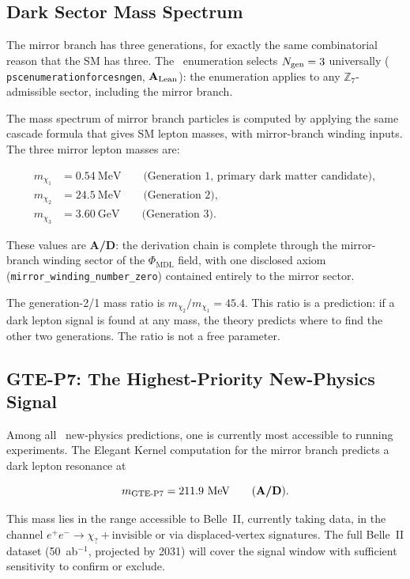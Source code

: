 \documentclass[11pt,openany]{book}
\theoremstyle{remark}
\newcommand{\GTE}{\text{GTE}}
\newcommand{\MDL}{\text{MDL}}
\newcommand{\PSC}{\text{PSC}}
\newcommand{\ZS}{\mathbb{Z}_7}
\newcommand{\lean}[1]{%
  \penalty-100
  \begingroup\def\_{\textunderscore\allowbreak}\texttt{#1}\endgroup}
\newcommand{\CatAL}{\ensuremath{\textbf{A}_{\rm Lean}}}
\newcommand{\CatAD}{\textbf{A/D}}
\begin{document}
\subsection*{Dark Sector Mass Spectrum}

The mirror branch has three generations, for exactly the same combinatorial reason that
the SM has three.  The \PSC\ enumeration selects $N_{\rm gen} = 3$ universally
(\lean{psc\_enumeration\_forces\_ngen\_3}, \CatAL): the enumeration applies to any
$\ZS$-admissible sector, including the mirror branch.

The mass spectrum of mirror branch particles is computed by applying the same cascade
formula that gives SM lepton masses, with mirror-branch winding inputs.  The three
mirror lepton masses are:

\begin{align}
m_{\chi_1} &= 0.54~\text{MeV} \qquad \text{(Generation 1, primary dark matter candidate)}, \\
m_{\chi_2} &= 24.5~\text{MeV} \qquad \text{(Generation 2)}, \\
m_{\chi_3} &= 3.60~\text{GeV} \qquad \text{(Generation 3)}.
\end{align}

These values are \CatAD: the derivation chain is complete through the mirror-branch
winding sector of the $\Phi_\MDL$ field, with one disclosed axiom
(\texttt{mirror\_winding\_number\_zero}) contained entirely to the mirror sector.

The generation-2/1 mass ratio is $m_{\chi_2}/m_{\chi_1} = 45.4$.  This ratio is a
prediction: if a dark lepton signal is found at any mass, the theory predicts where to
find the other two generations.  The ratio is not a free parameter.

\subsection*{GTE-P7: The Highest-Priority New-Physics Signal}

Among all \GTE\ new-physics predictions, one is currently most accessible to running
experiments.  The Elegant Kernel computation for the mirror branch predicts a dark
lepton resonance at

\begin{equation}
m_{\rm GTE\text{-}P7} = 211.9~\text{MeV} \qquad (\CatAD).
\end{equation}

This mass lies in the range accessible to Belle~II, currently taking data, in the channel
$e^+e^- \to \chi_? + \text{invisible}$ or via displaced-vertex signatures.  The full
Belle~II dataset (50~ab$^{-1}$, projected by 2031) will cover the signal window with
sufficient sensitivity to confirm or exclude.
\end{document}
